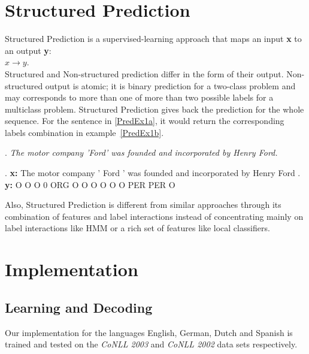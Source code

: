 \documentclass[11pt]{article}
\begin{document}
\section{Structured Prediction}
Structured Prediction \cite{strlearn} is a supervised-learning approach that maps an input \textbf{x} to an output \textbf{y}: \\

$ x \rightarrow y $. \\

Structured and  Non-structured prediction differ in the form of their output. 
Non-structured output is atomic; it is binary prediction for a two-class problem and may corresponds to more than one of more than two possible labels for a 
multiclass problem. 
Structured Prediction gives back the prediction for the whole sequence. 
For the sentence in \ref{PredEx1a}, it would return the corresponding labels combination in example~\ref{PredEx1b}. 

\begin{figure*}[ht]

\ex. \emph{The motor company 'Ford' was founded and incorporated  by Henry Ford.} \label{PredEx1a}
 
\exg. \textbf{x:} The motor company ' Ford ' was founded and incorporated by Henry Ford .\\
      \textbf{y:}  O   O      O     0 ORG  O  O     O     O       O        O PER   PER  O  \label{PredEx1b} \\
\caption{Input and predicted structure for the Named Entity task.}

\end{figure*}

Also, Structured Prediction is different from similar approaches through its combination of features and label interactions instead
of concentrating mainly on label interactions like HMM or a rich set of features like local classifiers. 

\section{Implementation}

\subsection{Learning and Decoding}

Our implementation for the languages English, German, Dutch and Spanish is trained and tested on the \emph{CoNLL 2003} and \emph{CoNLL 2002} data sets respectively. 
\end{document}
